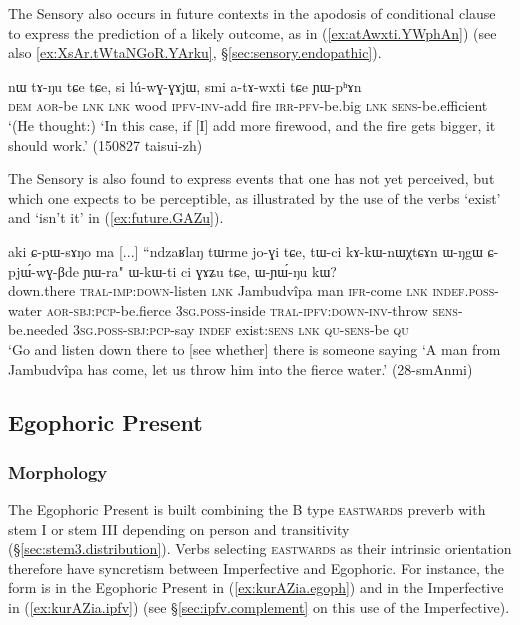 The Sensory also occurs in future contexts in the apodosis of conditional clause to express the prediction of a likely outcome, as in (\ref{ex:atAwxti.YWphAn}) (see also \ref{ex:XsAr.tWtaNGoR.YArku}, §\ref{sec:sensory.endopathic}).

\begin{exe}
\ex \label{ex:atAwxti.YWphAn}
\gll nɯ tɤ-ŋu tɕe tɕe, si lú-wɣ-ɣɤjɯ, smi a-tɤ-wxti tɕe ɲɯ-pʰɤn \\
\textsc{dem} \textsc{aor}-be \textsc{lnk} \textsc{lnk} wood \textsc{ipfv}-\textsc{inv}-add fire \textsc{irr}-\textsc{pfv}-be.big \textsc{lnk} \textsc{sens}-be.efficient \\
\glt `(He thought:) `In this case, if [I] add more firewood, and the fire gets bigger, it should work.' (150827 taisui-zh)
\end{exe}

The Sensory is also found to express events that one has not yet perceived, but which one expects to be perceptible, as illustrated by the use of the verbs  `exist' and  `isn't it' in (\ref{ex:future.GAZu}).

\begin{exe}
\ex \label{ex:future.GAZu}
\gll  aki ɕ-pɯ-sɤŋo ma [...] ``ndzaʁlaŋ tɯrme jo-ɣi tɕe, tɯ-ci kɤ-kɯ-nɯχtɕɤn ɯ-ŋgɯ ɕ-pjɯ́-wɣ-βde ɲɯ-ra" ɯ-kɯ-ti ci ɣɤʑu tɕe, ɯ-ɲɯ́-ŋu kɯ? \\
down.there \textsc{tral}-\textsc{imp}:\textsc{down}-listen \textsc{lnk} { } Jambudvîpa man \textsc{ifr}-come \textsc{lnk} \textsc{indef}.\textsc{poss}-water \textsc{aor}-\textsc{sbj}:\textsc{pcp}-be.fierce \textsc{3sg}.\textsc{poss}-inside \textsc{tral}-\textsc{ipfv}:\textsc{down}-\textsc{inv}-throw \textsc{sens}-be.needed \textsc{3sg}.\textsc{poss}-\textsc{sbj}:\textsc{pcp}-say \textsc{indef} exist:\textsc{sens} \textsc{lnk} \textsc{qu}-\textsc{sens}-be \textsc{qu} \\
\glt `Go and listen down there to [see whether] there is someone saying `A man from Jambudvîpa has come, let us throw him into the fierce water.' (28-smAnmi)
\end{exe}

\subsection{Egophoric Present} \label{sec:egophoric}
 

\subsubsection{Morphology} \label{sec:egophoric.morphology}
The Egophoric Present is built combining the B type \textsc{eastwards}  preverb with stem I or stem III depending on person and transitivity (§\ref{sec:stem3.distribution}). Verbs selecting \textsc{eastwards} as their intrinsic orientation therefore have syncretism between Imperfective and Egophoric. For instance, the form  is in the Egophoric Present in (\ref{ex:kurAZia.egoph}) and in the Imperfective in (\ref{ex:kurAZia.ipfv}) (see §\ref{sec:ipfv.complement} on this use of the Imperfective).


